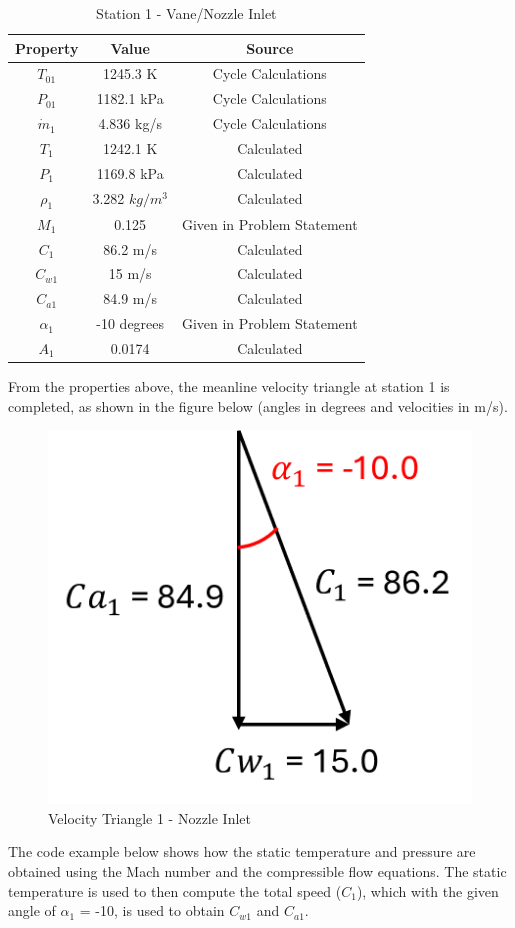 \documentclass[12pt, letter]{report}
\begin{document}
\begin{table}[H]
\caption{Station 1 - Vane/Nozzle Inlet}
\centering
\begin{tabular}{|c|c|c|}
\hline
\textbf{Property} & \textbf{Value} & \textbf{Source}\\ \hline
$T_{01}$ & 1245.3 K & Cycle Calculations \\ \hline
$P_{01}$ & 1182.1 kPa & Cycle Calculations\\ \hline
$\dot{m}_1$ & 4.836 kg/s & Cycle Calculations\\ \hline
$T_{1}$ & 1242.1 K & Calculated \\ \hline
$P_{1}$ & 1169.8 kPa & Calculated\\ \hline
$\rho_{1}$ & 3.282 $kg/m^3$ & Calculated\\ \hline
$M_{1}$ & 0.125 & Given in Problem Statement\\ \hline
$C_1$ & 86.2 m/s & Calculated \\ \hline
$C_{w1}$ & 15 m/s & Calculated \\ \hline
$C_{a1}$ & 84.9 m/s& Calculated\\ \hline
$\alpha_1$ & -10 degrees & Given in Problem Statement\\ \hline
$A_1$ & 0.0174 & Calculated \\ \hline
\end{tabular}
\label{tab:my_label}
\end{table}


From the properties above, the meanline velocity triangle at station 1 is completed, as shown in the figure below (angles in degrees and velocities in m/s). 

\begin{figure}[H]
    \centering
    \includegraphics[width=0.3\linewidth]{figures/velocty_triangle_1.png}
    \caption{Velocity Triangle 1 - Nozzle Inlet}
    \label{fig:enter-label}
\end{figure}

\par
The code example below shows how the static temperature and pressure are obtained using the Mach number and the compressible flow equations. The static temperature is used to then compute the total speed ($C_1$), which with the given angle of $\alpha_1$ = -10, is used to obtain $C_{w1}$ and $C_{a1}$. 
\end{document}

